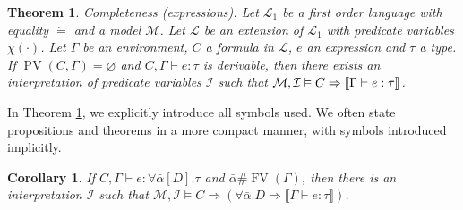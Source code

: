 \documentclass{article}
\newcommand{\cdummy}{\cdot}
\newcommand{\tmem}[1]{{\em #1\/}}
\newcommand{\tmop}[1]{\ensuremath{\operatorname{#1}}}
\newtheorem{corollary}{Corollary}
\newtheorem{theorem}{Theorem}
\begin{document}
\begin{theorem}
  \label{InfComplExpr}{\tmem{Completeness}} (expressions). Let $\mathcal{L}_1$
  be a first order language with equality $\dot{=}$ and a model $\mathcal{M}$.
  Let $\mathcal{L}$ be an extension of $\mathcal{L}_1$ with predicate
  variables $\chi (\cdummy)$. Let $\Gamma$ be an environment, $C$ a formula in
  $\mathcal{L}$, $e$ an expression and $\tau$ a type. If $\tmop{PV} (C,
  \Gamma) = \varnothing$ and $C, \Gamma \vdash e : \tau$ is derivable, then
  there exists an interpretation of predicate variables $\mathcal{I}$ such
  that $\mathcal{M}, \mathcal{I} \vDash C \Rightarrow \left\llbracket \Gamma
  \vdash e : {\nobreak} \tau \right\rrbracket$.
\end{theorem}

In Theorem \ref{InfComplExpr}, we explicitly introduce all symbols used. We
often state propositions and theorems in a more compact manner, with symbols
introduced implicitly.

\begin{corollary}
  \label{InfComplCoro}If $C, \Gamma \vdash e : \forall \bar{\alpha} [D] .
  \tau$ and $\bar{\alpha} \# \tmop{FV} (\Gamma)$, then there is an
  interpretation $\mathcal{I}$ such that $\mathcal{M}, \mathcal{I} \vDash C
  \Rightarrow (\forall \bar{\alpha} .D \Rightarrow \llbracket \Gamma \vdash e
  : \tau \rrbracket)$.
\end{corollary}
\end{document}
